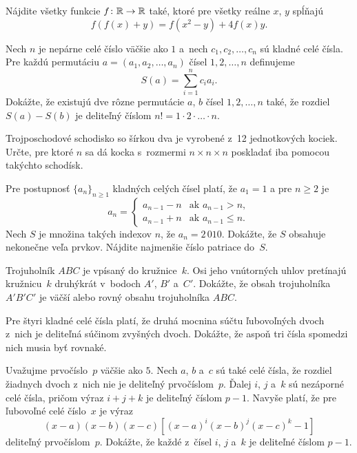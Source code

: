 {%
Nájdite všetky funkcie $f\colon \Bbb R \to \Bbb R$ také, ktoré pre všetky reálne $x$, $y$ spĺňajú
$$
f(f(x)+y)=f(x^2-y)+4f(x)y.
$$
}

{%
Nech $n$ je nepárne celé číslo väčšie ako $1$ a~nech $c_1,c_2,\dots,c_n$ sú kladné celé čísla. Pre každú permutáciu $a=(a_1,a_2,\dots,a_n)$ čísel $1,2,\dots,n$ definujeme
$$
S(a)=\sum_{i=1}^nc_ia_i.
$$
Dokážte, že existujú dve rôzne permutácie $a$, $b$ čísel $1,2, \dots,n$ také, že rozdiel ${S(a)-S(b)}$ je deliteľný číslom $n!=1\cdot2\cdot\dots\cdot n$.
}

{%
Trojposchodové schodisko so šírkou dva je vyrobené z~12 jednotkových kociek. Určte, pre ktoré $n$ sa dá kocka s~rozmermi $n \times n \times n$ poskladať iba pomocou takýchto schodísk.}

{%
Pre postupnosť $\{a_n\}_{n\ge 1}$ kladných celých čísel platí, že $a_1 = 1$ a pre $n\ge 2$ je
$$
a_n = \begin{cases}
a_{n-1} - n & \text{ak } a_{n-1} > n, \\
a_{n-1} + n & \text{ak } a_{n-1} \le n.
\end{cases}
$$
Nech $S$ je množina takých indexov $n$, že $a_n=2\,010$.
Dokážte, že $S$ obsahuje nekonečne veľa prvkov.
Nájdite najmenšie číslo patriace do~$S$.
}

{%
Trojuholník $ABC$ je vpísaný do kružnice~$k$. Osi jeho vnútorných uhlov pretínajú kružnicu~$k$ druhýkrát v~bodoch  $A'$, $B'$ a~$C'$. Dokážte, že obsah trojuholníka $A'B'C'$ je väčší alebo rovný obsahu trojuholníka $ABC$.
}

{%
Pre štyri kladné celé čísla platí, že druhá mocnina súčtu ľubovoľných dvoch z~nich je deliteľná súčinom zvyšných dvoch. Dokážte, že aspoň tri čísla spomedzi nich musia byť rovnaké.
}

{%
Uvažujme prvočíslo~$p$ väčšie ako $5$. Nech $a$, $b$ a~$c$ sú také celé čísla, že rozdiel žiadnych dvoch z~nich nie je deliteľný prvočíslom~$p$. Ďalej $i$, $j$ a~$k$ sú nezáporné celé čísla, pričom výraz $i+j+k$ je deliteľný číslom $p-1$. Navyše platí, že pre ľubovoľné celé číslo~$x$ je výraz
$$
(x-a)(x-b)(x-c)[(x-a)^{i}(x-b)^{j}(x-c)^{k}-1]
$$
deliteľný prvočíslom~$p$. Dokážte, že každé z~čísel $i$, $j$ a~$k$ je deliteľné číslom $p-1$.
}

